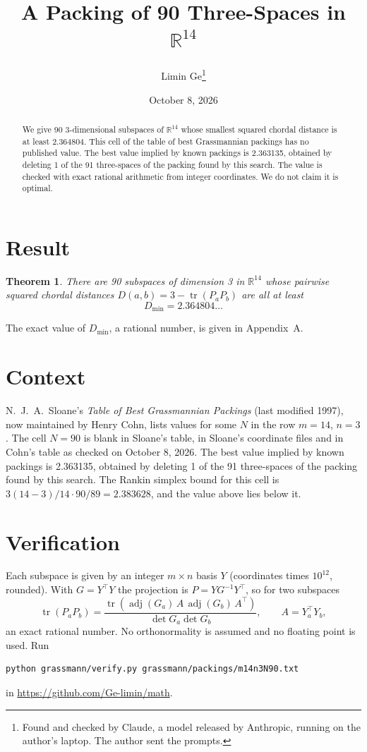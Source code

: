 \documentclass[11pt,a4paper]{article}
\title{A Packing of 90 Three-Spaces in $\mathbb{R}^{14}$}
\author{Limin Ge\thanks{Found and checked by Claude, a model released by Anthropic, running on the author's laptop. The author sent the prompts.}}
\date{October 8, 2026}
\newtheorem*{theorem}{Theorem}
\begin{document}
\maketitle
\begin{abstract}
We give 90 3-dimensional subspaces of $\mathbb{R}^{14}$ whose smallest squared chordal distance is at least 2.364804. This cell of the table of best Grassmannian packings has no published value. The best value implied by known packings is 2.363135, obtained by deleting 1 of the 91 three-spaces of the packing found by this search. The value is checked with exact rational arithmetic from integer coordinates. We do not claim it is optimal.
\end{abstract}

\section{Result}
\begin{theorem}
There are 90 subspaces of dimension 3 in $\mathbb{R}^{14}$ whose pairwise squared chordal distances $D(a,b) = 3 - \operatorname{tr}(P_aP_b)$ are all at least
\[ D_{\min} = 2.364804\ldots \]
\end{theorem}
The exact value of $D_{\min}$, a rational number, is given in Appendix~A.


\section{Context}
N.~J.~A.~Sloane's \emph{Table of Best Grassmannian Packings} (last modified 1997), now maintained by Henry Cohn, lists values for some $N$ in the row $m=14$, $n=3$. The cell $N=90$ is blank in Sloane's table, in Sloane's coordinate files and in Cohn's table as checked on October 8, 2026. The best value implied by known packings is 2.363135, obtained by deleting 1 of the 91 three-spaces of the packing found by this search. The Rankin simplex bound for this cell is $3(14-3)/14\cdot 90/89 = 2.383628$, and the value above lies below it.


\section{Verification}
Each subspace is given by an integer $m\times n$ basis $Y$ (coordinates times $10^{12}$, rounded). With $G=Y^\top Y$ the projection is $P=YG^{-1}Y^\top$, so for two subspaces
\[ \operatorname{tr}(P_aP_b)=\frac{\operatorname{tr}(\operatorname{adj}(G_a)\,A\,\operatorname{adj}(G_b)\,A^\top)}{\det G_a\det G_b},\qquad A=Y_a^\top Y_b, \]
an exact rational number. No orthonormality is assumed and no floating point is used. Run
\begin{verbatim}
python grassmann/verify.py grassmann/packings/m14n3N90.txt
\end{verbatim}
in \url{https://github.com/Ge-limin/math}.
\end{document}
